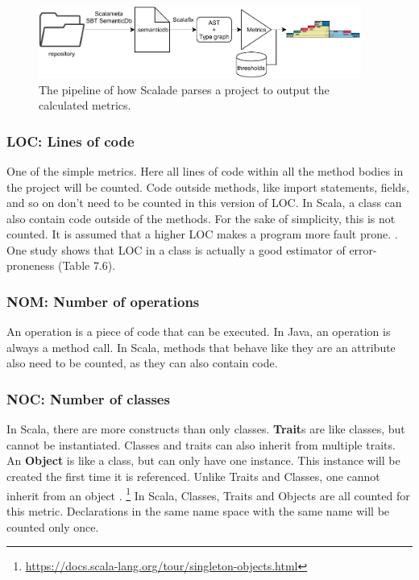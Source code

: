 \documentclass[onecolumn]{article}
\begin{document}
\begin{figure}[H]
  \centering
  \includegraphics[width=300pt]{fig/architecture-overview_pyramid_pipeline.pdf}
  \caption{The pipeline of how Scalade parses a project to output the calculated metrics.}
  \label{fig:architecture-overview_pyramid_pipeline}
\end{figure}


\subsubsection{LOC: Lines of code} \label{overview_pyramid_LOC}
One of the simple metrics. Here all lines of code within all the method bodies in the project will be counted. Code outside methods, like import statements, fields, and so on don’t need to be counted in this version of LOC. In Scala, a class can also contain code outside of the methods. For the sake of simplicity, this is not counted. It is assumed that a higher LOC makes a program more fault prone. \cite{basili1996validation}. One study shows that LOC in a class is actually a good estimator of error-proneness \cite{GithubScalametaContributers}(Table 7.6).


\subsubsection{NOM: Number of operations} \label{overview_pyramid_NOM}
An operation is a piece of code that can be executed. In Java, an operation is always a method call. In Scala, methods that behave like they are an attribute also need to be counted, as they can also contain code.


\subsubsection{NOC: Number of classes} \label{overview_pyramid_NOC}
In Scala, there are more constructs than only classes.
\textbf{Trait}s are like classes, but cannot be instantiated. Classes and traits can also inherit from multiple traits.
An \textbf{Object} is like a class, but can only have one instance. This instance will be created the first time it is referenced. Unlike Traits and Classes, one cannot inherit from an object \cite{odersky2008programming}. \footnote{\url{https://docs.scala-lang.org/tour/singleton-objects.html}}
In Scala, Classes, Traits and Objects are all counted for this metric. Declarations in the same name space with the same name will be counted only once.
\end{document}
